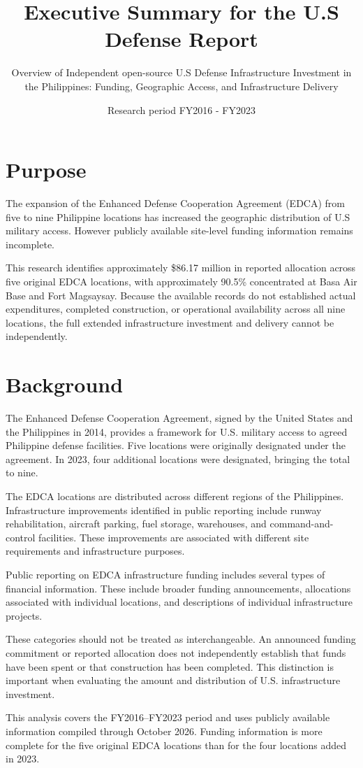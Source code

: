 \documentclass[11pt]{article}
\title{Executive Summary for the U.S Defense Report}
\author{Overview of Independent open-source 
U.S Defense Infrastructure Investment in the Philippines: Funding, Geographic Access, and Infrastructure Delivery}
\date{Research period FY2016 - FY2023}
\begin{document}
\section{Purpose }
The expansion of the Enhanced Defense Cooperation Agreement (EDCA) from five to nine Philippine locations has increased the geographic distribution of U.S military access. However publicly available site-level funding information remains incomplete.

This research identifies approximately \$86.17 million in reported allocation across five original EDCA locations, with approximately 90.5\% concentrated at Basa Air Base and Fort Magsaysay. Because the available records do not established actual expenditures, completed construction, or operational availability across all nine locations, the full extended infrastructure investment and delivery cannot be independently.

\section{Background}
The Enhanced Defense Cooperation Agreement, signed by the United States and the Philippines in 2014, provides a framework for U.S. military access to agreed Philippine defense facilities. Five locations were originally designated under the agreement. In 2023, four additional locations were designated, bringing the total to nine.

The EDCA locations are distributed across different regions of the Philippines. Infrastructure improvements identified in public reporting include runway rehabilitation, aircraft parking, fuel storage, warehouses, and command-and-control facilities. These improvements are associated with different site requirements and infrastructure purposes.

Public reporting on EDCA infrastructure funding includes several types of financial information. These include broader funding announcements, allocations associated with individual locations, and descriptions of individual infrastructure projects.

These categories should not be treated as interchangeable. An announced funding commitment or reported allocation does not independently establish that funds have been spent or that construction has been completed. This distinction is important when evaluating the amount and distribution of U.S. infrastructure investment.

This analysis covers the FY2016--FY2023 period and uses publicly available information compiled through October 2026. Funding information is more complete for the five original EDCA locations than for the four locations added in 2023. \par
\end{document}
